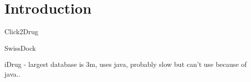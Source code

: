 \section{Introduction}

Click2Drug \cite{Villoutreix_2013}

SwissDock \cite{Grosdidier_2011}

iDrug \cite{Wang_2014} - largest database is 3m, uses java, probably slow but can't use because of java..